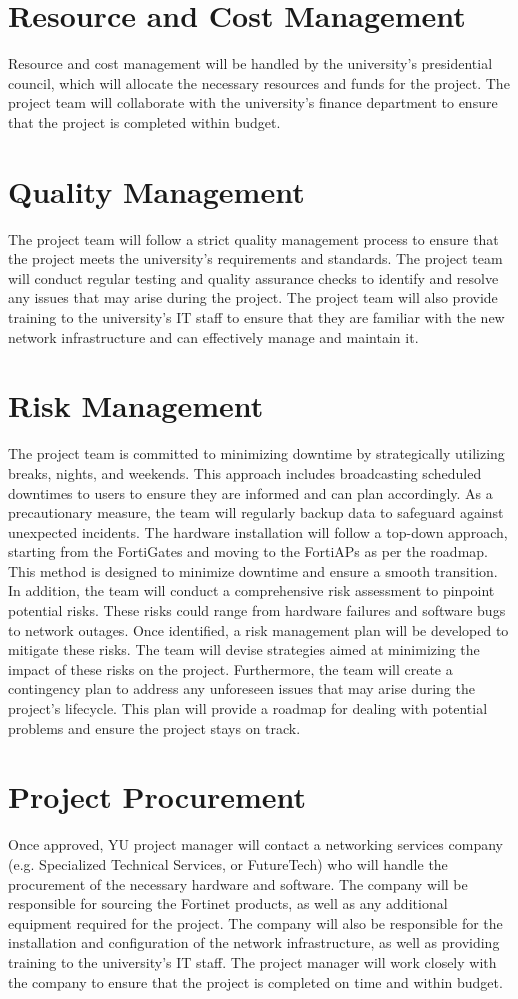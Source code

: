 \documentclass[12pt]{report}
\begin{document}
\section{Resource and Cost Management}
Resource and cost management will be handled by the university's presidential council, which will allocate the necessary resources and funds for the project. The project team will collaborate with the university's finance department to ensure that the project is completed within budget.
\section{Quality Management}
The project team will follow a strict quality management process to ensure that the project meets the university's requirements and standards. The project team will conduct regular testing and quality assurance checks to identify and resolve any issues that may arise during the project. The project team will also provide training to the university's IT staff to ensure that they are familiar with the new network infrastructure and can effectively manage and maintain it.
\section{Risk Management}
The project team is committed to minimizing downtime by strategically utilizing breaks, nights, and weekends. This approach includes broadcasting scheduled downtimes to users to ensure they are informed and can plan accordingly. As a precautionary measure, the team will regularly backup data to safeguard against unexpected incidents. The hardware installation will follow a top-down approach, starting from the FortiGates and moving to the FortiAPs as per the roadmap. This method is designed to minimize downtime and ensure a smooth transition. In addition, the team will conduct a comprehensive risk assessment to pinpoint potential risks. These risks could range from hardware failures and software bugs to network outages. Once identified, a risk management plan will be developed to mitigate these risks. The team will devise strategies aimed at minimizing the impact of these risks on the project. Furthermore, the team will create a contingency plan to address any unforeseen issues that may arise during the project's lifecycle. This plan will provide a roadmap for dealing with potential problems and ensure the project stays on track.
\section{Project Procurement}
Once approved, YU project manager will contact a networking services company (e.g. Specialized Technical Services, or FutureTech) who will handle the procurement of the necessary hardware and software. The company will be responsible for sourcing the Fortinet products, as well as any additional equipment required for the project. The company will also be responsible for the installation and configuration of the network infrastructure, as well as providing training to the university's IT staff. The project manager will work closely with the company to ensure that the project is completed on time and within budget.
\end{document}
